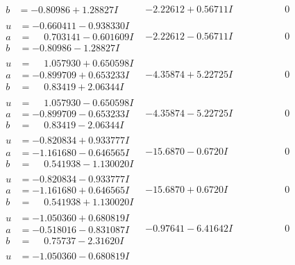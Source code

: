 \documentclass[1p]{elsarticle_modified}
\theoremstyle{definition}
\begin{document}
$$\begin{array}{c|c|c}
\begin{aligned}
b &= -0.80986 + 1.28827 I\end{aligned}
 & -2.22612 + 0.56711 I & \phantom{-0.000000 } 0 \\ \hline\begin{aligned}
u &= -0.660411 - 0.938330 I \\
a &= \phantom{-}0.703141 - 0.601609 I \\
b &= -0.80986 - 1.28827 I\end{aligned}
 & -2.22612 - 0.56711 I & \phantom{-0.000000 } 0 \\ \hline\begin{aligned}
u &= \phantom{-}1.057930 + 0.650598 I \\
a &= -0.899709 + 0.653233 I \\
b &= \phantom{-}0.83419 + 2.06344 I\end{aligned}
 & -4.35874 + 5.22725 I & \phantom{-0.000000 } 0 \\ \hline\begin{aligned}
u &= \phantom{-}1.057930 - 0.650598 I \\
a &= -0.899709 - 0.653233 I \\
b &= \phantom{-}0.83419 - 2.06344 I\end{aligned}
 & -4.35874 - 5.22725 I & \phantom{-0.000000 } 0 \\ \hline\begin{aligned}
u &= -0.820834 + 0.933777 I \\
a &= -1.161680 - 0.646565 I \\
b &= \phantom{-}0.541938 - 1.130020 I\end{aligned}
 & -15.6870 - 0.6720 I & \phantom{-0.000000 } 0 \\ \hline\begin{aligned}
u &= -0.820834 - 0.933777 I \\
a &= -1.161680 + 0.646565 I \\
b &= \phantom{-}0.541938 + 1.130020 I\end{aligned}
 & -15.6870 + 0.6720 I & \phantom{-0.000000 } 0 \\ \hline\begin{aligned}
u &= -1.050360 + 0.680819 I \\
a &= -0.518016 - 0.831087 I \\
b &= \phantom{-}0.75737 - 2.31620 I\end{aligned}
 & -0.97641 - 6.41642 I & \phantom{-0.000000 } 0 \\ \hline\begin{aligned}
u &= -1.050360 - 0.680819 I \\

\end{aligned}
\end{array}$$
\end{document}
